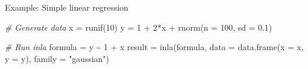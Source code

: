 \documentclass[
  handout]{beamer}
\newenvironment{Shaded}{\begin{snugshade}}{\end{snugshade}}
\newcommand{\AttributeTok}[1]{\textcolor[rgb]{0.77,0.63,0.00}{#1}}
\newcommand{\CommentTok}[1]{\textcolor[rgb]{0.56,0.35,0.01}{\textit{#1}}}
\newcommand{\DecValTok}[1]{\textcolor[rgb]{0.00,0.00,0.81}{#1}}
\newcommand{\FloatTok}[1]{\textcolor[rgb]{0.00,0.00,0.81}{#1}}
\newcommand{\FunctionTok}[1]{\textcolor[rgb]{0.00,0.00,0.00}{#1}}
\newcommand{\NormalTok}[1]{#1}
\newcommand{\OtherTok}[1]{\textcolor[rgb]{0.56,0.35,0.01}{#1}}
\newcommand{\SpecialCharTok}[1]{\textcolor[rgb]{0.00,0.00,0.00}{#1}}
\newcommand{\StringTok}[1]{\textcolor[rgb]{0.31,0.60,0.02}{#1}}
\begin{document}
\begin{frame}[fragile]{Example: Simple linear regression}
\protect\hypertarget{example-simple-linear-regression-1}{}
\begin{Shaded}
\begin{Highlighting}[]
\CommentTok{\# Generate data}
\NormalTok{x }\OtherTok{=} \FunctionTok{runif}\NormalTok{(}\DecValTok{10}\NormalTok{)}
\NormalTok{y }\OtherTok{=} \DecValTok{1} \SpecialCharTok{+} \DecValTok{2}\SpecialCharTok{*}\NormalTok{x }\SpecialCharTok{+} \FunctionTok{rnorm}\NormalTok{(}\AttributeTok{n =} \DecValTok{100}\NormalTok{, }\AttributeTok{sd =} \FloatTok{0.1}\NormalTok{)}

\CommentTok{\# Run inla}
\NormalTok{formula }\OtherTok{=}\NormalTok{ y }\SpecialCharTok{\textasciitilde{}} \DecValTok{1} \SpecialCharTok{+}\NormalTok{ x}
\NormalTok{result }\OtherTok{=} \FunctionTok{inla}\NormalTok{(formula,}
              \AttributeTok{data =} \FunctionTok{data.frame}\NormalTok{(}\AttributeTok{x =}\NormalTok{ x, }\AttributeTok{y =}\NormalTok{ y),}
              \AttributeTok{family =} \StringTok{"gaussian"}\NormalTok{)}
\end{Highlighting}
\end{Shaded}
\end{frame}
\end{document}
